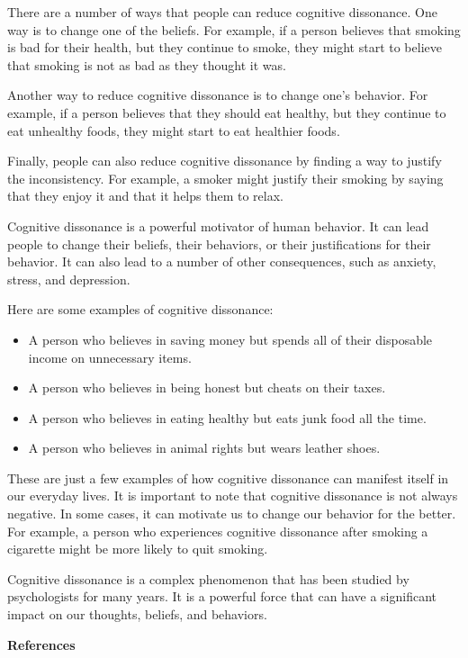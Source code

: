 \documentclass[
  b5paper]{book}
\begin{document}
There are a number of ways that people can reduce cognitive dissonance. One way is to change one of the beliefs. For example, if a person believes that smoking is bad for their health, but they continue to smoke, they might start to believe that smoking is not as bad as they thought it was.

Another way to reduce cognitive dissonance is to change one's behavior. For example, if a person believes that they should eat healthy, but they continue to eat unhealthy foods, they might start to eat healthier foods.

Finally, people can also reduce cognitive dissonance by finding a way to justify the inconsistency. For example, a smoker might justify their smoking by saying that they enjoy it and that it helps them to relax.

Cognitive dissonance is a powerful motivator of human behavior. It can lead people to change their beliefs, their behaviors, or their justifications for their behavior. It can also lead to a number of other consequences, such as anxiety, stress, and depression.

Here are some examples of cognitive dissonance:

\begin{itemize}
\item
  A person who believes in saving money but spends all of their disposable income on unnecessary items.
\item
  A person who believes in being honest but cheats on their taxes.
\item
  A person who believes in eating healthy but eats junk food all the time.
\item
  A person who believes in animal rights but wears leather shoes.
\end{itemize}

These are just a few examples of how cognitive dissonance can manifest itself in our everyday lives. It is important to note that cognitive dissonance is not always negative. In some cases, it can motivate us to change our behavior for the better. For example, a person who experiences cognitive dissonance after smoking a cigarette might be more likely to quit smoking.

Cognitive dissonance is a complex phenomenon that has been studied by psychologists for many years. It is a powerful force that can have a significant impact on our thoughts, beliefs, and behaviors.

\textbf{References}
\end{document}
